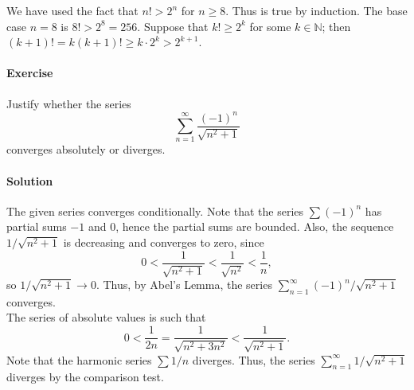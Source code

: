 \documentclass[10pt]{article}
\newcounter{prob}
\def\problem{\stepcounter{prob}\paragraph{Exercise \arabic{prob}}}
\def\solution{\paragraph{Solution}}
\begin{document}
\begin{enumerate}
                We have used the fact that $n! > 2^n$ for $n \geq 8$. Thus is true by induction. The base case $n = 8$ is $8! > 2^8 = 256$.
                Suppose that $k! \geq 2^k$ for some $k \in \mathbb{N}$; then $(k + 1)! = k(k + 1)! \geq k\cdot 2^k > 2^{k + 1}$.
        \end{enumerate}

        \problem Justify whether the series
        \[
                \sum_{n = 1}^\infty \frac{(-1)^n}{\sqrt{n^2 + 1}}
        \]
        converges absolutely or diverges.

        \solution The given series converges conditionally. Note that the series $\sum (-1)^n$ has partial sums $-1$ and $0$, hence
        the partial sums are bounded. Also, the sequence $1 /\sqrt{n^2 + 1}$ is decreasing and converges to zero, since
        \[
                0 < \frac{1}{\sqrt{n^2 + 1}} < \frac{1}{\sqrt{n^2}} < \frac{1}{n},
        \]
        so $1 /\sqrt{n^2 + 1} \to 0$. Thus, by Abel's Lemma, the series $\sum_{n = 1}^\infty (-1)^n/\sqrt{n^2 + 1}$ converges. \\

        The series of absolute values is such that
        \[
                0 < \frac{1}{2n} = \frac{1}{\sqrt{n^2 + 3n^2}} < \frac{1}{\sqrt{n^2 + 1}}.
        \]
        Note that the harmonic series $\sum 1 /n$ diverges.
        Thus, the series $\sum_{n = 1}^\infty 1 /\sqrt{n^2 + 1}$ diverges by the comparison test.
\end{document}
